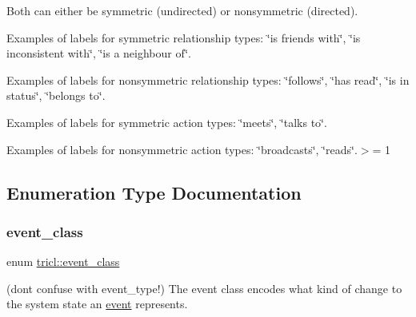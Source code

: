 Both can either be symmetric (undirected) or nonsymmetric (directed).

Examples of labels for symmetric relationship types\+: \char`\"{}is friends with\char`\"{}, \char`\"{}is inconsistent with\char`\"{}, \char`\"{}is a neighbour of\char`\"{}.

Examples of labels for nonsymmetric relationship types\+: \char`\"{}follows\char`\"{}, \char`\"{}has read\char`\"{}, \char`\"{}is in status\char`\"{}, \char`\"{}belongs to\char`\"{}.

Examples of labels for symmetric action types\+: \char`\"{}meets\char`\"{}, \char`\"{}talks to\char`\"{}.

Examples of labels for nonsymmetric action types\+: \char`\"{}broadcasts\char`\"{}, \char`\"{}reads\char`\"{}.$>$= 1 

\subsection{Enumeration Type Documentation}
\mbox{\label{namespacetricl_a6967089e2c0837f273d8cb5fd9f7e46d}} 
\subsubsection{\texorpdfstring{event\+\_\+class}{event\_class}}
{\footnotesize\ttfamily enum \hyperlink{namespacetricl_a6967089e2c0837f273d8cb5fd9f7e46d}{tricl\+::event\+\_\+class}}



(don\textquotesingle{}t confuse with event\+\_\+type!) The event class encodes what kind of change to the system state an \hyperlink{structtricl_1_1event}{event} represents. 

